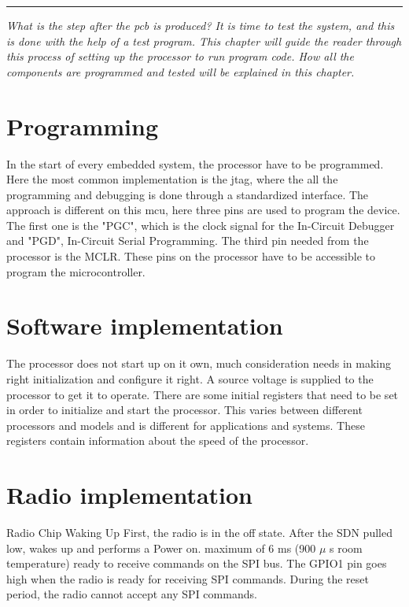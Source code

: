\vspace{-10ex}%
\rule{\textwidth}{0.3pt}
\vspace{5ex}

\textit{
What is the step after the \gls{pcb} is produced? It is time to test the system, and this is done with the help of a test program. This chapter will guide the reader through this process of setting up the processor to run program code. How all the components are programmed and tested will be explained in this chapter. 
}

\section{Programming} 
In the start of every embedded system, the processor have to be programmed. Here the most common implementation is the \gls{jtag}, where the all the programming and debugging is done through a standardized interface. The approach is different on this \gls{mcu}, here three pins are used to program the device. The first one is the "PGC", which is the clock signal for the In-Circuit Debugger and "PGD", In-Circuit Serial Programming. The third pin needed from the processor is the MCLR. These pins on the processor have to be accessible to program the microcontroller. %


\section{Software implementation}
The processor does not start up on it own, much consideration needs in making right initialization and configure it right. A source voltage is supplied to the processor to get it to operate. There are some initial registers that need to be set in order to initialize and start the processor. This varies between different processors and models and is different for applications and systems. These registers contain information about the speed of the processor.    


\section{Radio implementation} %
Radio Chip Waking Up First, the radio is in the off state. After the SDN pulled low, wakes up and performs a Power on.
maximum of 6 ms  (900 $\mu$ s room temperature) ready to receive commands on the SPI bus. The GPIO1 pin goes high when the radio is ready for receiving SPI commands. During the reset period, the radio cannot accept any SPI commands. 




